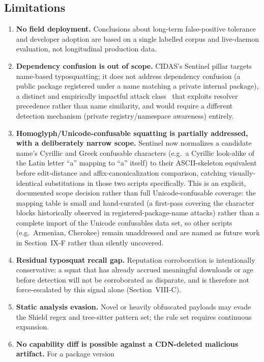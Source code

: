 \documentclass[journal]{IEEEtran}
\begin{document}
\subsection{Limitations}
\begin{enumerate}
\item \textbf{No field deployment.} Conclusions about long-term false-positive tolerance and developer
adoption are based on a single labelled corpus and live-daemon evaluation, not longitudinal production data.
\item \textbf{Dependency confusion is out of scope.} CIDAS's Sentinel pillar targets name-based
typosquatting; it does not address dependency confusion (a public package registered under a name matching a
private internal package), a distinct and empirically impactful attack class~\cite{birsan2021} that exploits
resolver precedence rather than name similarity, and would require a different detection mechanism (private
registry/namespace awareness) entirely.
\item \textbf{Homoglyph/Unicode-confusable squatting is partially addressed, with a deliberately narrow
scope.} Sentinel now normalizes a candidate name's Cyrillic and Greek confusable characters (e.g.\ a
Cyrillic look-alike of the Latin letter ``a'' mapping to ``a'' itself) to their ASCII-skeleton equivalent
before edit-distance and affix-canonicalization comparison, catching visually-identical substitutions in
those two scripts specifically. This is an explicit, documented scope decision rather than full
Unicode-confusable coverage: the mapping table is small and hand-curated (a first-pass covering the character
blocks historically observed in registered-package-name attacks) rather than a complete import of the Unicode
confusables data set, so other scripts (e.g.\ Armenian, Cherokee) remain unaddressed and are named as future
work in Section~IX-F rather than silently uncovered.
\item \textbf{Residual typosquat recall gap.} Reputation corroboration is intentionally conservative: a
squat that has already accrued meaningful downloads or age before detection will not be corroborated as
disparate, and is therefore not force-escalated by this signal alone (Section~VIII-C).
\item \textbf{Static analysis evasion.} Novel or heavily obfuscated payloads may evade the Shield regex and
tree-sitter pattern set; the rule set requires continuous expansion.
\item \textbf{No capability diff is possible against a CDN-deleted malicious artifact.} For a package version

\end{enumerate}
\end{document}
